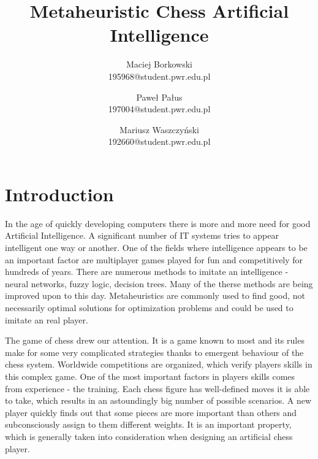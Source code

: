 \documentclass[pdftex]{article}
\date{}
\title{Metaheuristic Chess Artificial Intelligence}
\author{Maciej Borkowski\\ 195968@student.pwr.edu.pl \and Paweł Pałus\\ 197004@student.pwr.edu.pl  \and Mariusz Waszczyński\\  192660@student.pwr.edu.pl }
\begin{document}
\thispagestyle{empty}

\section{Introduction}
\label{sec:introduction}

In the age of quickly developing computers there is more and more need for good Artificial Intelligence. A significant number of IT systems tries to appear intelligent one way or another. One of the fields where intelligence appears to be an important factor are multiplayer games played for fun and competitively for hundreds of years. There are numerous methods to imitate an intelligence - neural networks, fuzzy logic, decision trees. Many of the therse methods are being improved upon to this day. Metaheuristics are commonly used to find good, not necessarily optimal solutions for optimization problems and could be used to imitate an real player.

The game of chess drew our attention. It is a game known to most and its rules make for some very complicated strategies thanks to emergent behaviour of the chess system. Worldwide competitions are organized, which verify players skills in this complex game. One of the most important factors in players skills comes from experience - the training. Each chess figure has well-defined moves it is able to take, which results in an astoundingly big number of possible scenarios. A new player quickly finds out that some pieces are more important than others and subconsciously assign to them different weights. It is an important property, which is generally taken into consideration when designing an artificial chess player.~\cite{comparison}
\end{document}
